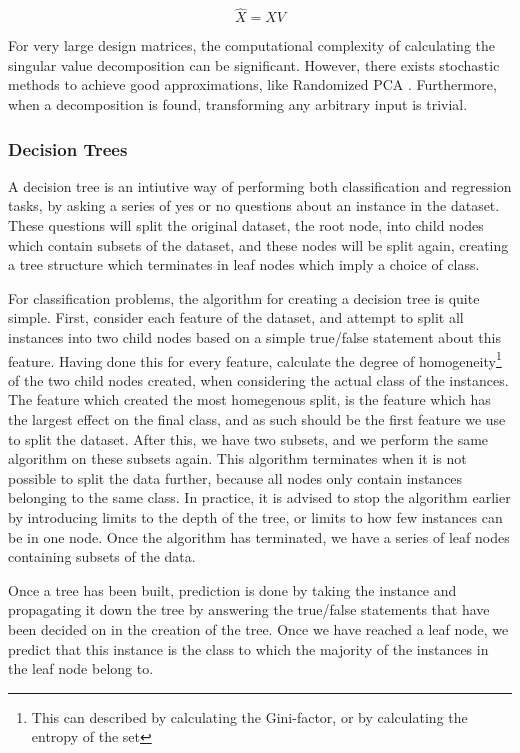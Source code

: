 \documentclass[onecolumn,10pt,cleanfoot]{asme2ej}
\begin{document}
\begin{equation}
\hat{X} = XV
\end{equation}

For very large design matrices, the computational complexity of calculating the singular value decomposition can be significant. However, there exists stochastic methods to achieve good approximations, like Randomized PCA \cite[227]{halko}. Furthermore, when a decomposition is found, transforming any arbitrary input is trivial.

\subsubsection{Decision Trees}

A decision tree is an intiutive way of performing both classification and regression tasks, by asking a series of yes or no questions about an instance in the dataset. These questions will split the original dataset, the root node, into child nodes which contain subsets of the dataset, and these nodes will be split again, creating a tree structure which terminates in leaf nodes which imply a choice of class.

For classification problems, the algorithm for creating a decision tree is quite simple. First, consider each feature of the dataset, and attempt to split all instances into two child nodes based on a simple true/false statement about this feature. Having done this for every feature, calculate the degree of homogeneity\footnote{This can described by calculating the Gini-factor, or by calculating the entropy of the set} of the two child nodes created, when considering the actual class of the instances. The feature which created the most homegenous split, is the feature which has the largest effect on the final class, and as such should be the first feature we use to split the dataset. After this, we have two subsets, and we perform the same algorithm on these subsets again. This algorithm terminates when it is not possible to split the data further, because all nodes only contain instances belonging to the same class. In practice, it is advised to stop the algorithm earlier by introducing limits to the depth of the tree, or limits to how few instances can be in one node. Once the algorithm has terminated, we have a series of leaf nodes containing subsets of the data.

Once a tree has been built, prediction is done by taking the instance and propagating it down the tree by answering the true/false statements that have been decided on in the creation of the tree. Once we have reached a leaf node, we predict that this instance is the class to which the majority of the instances in the leaf node belong to.
\end{document}
